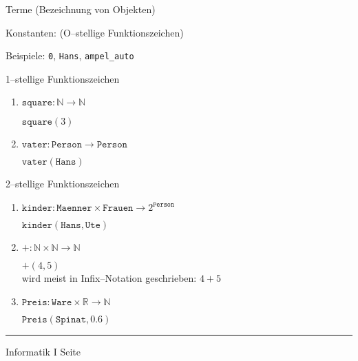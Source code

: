 
\begin{slide}{}
\normalsize
\begin{center}
Terme (Bezeichnung von Objekten)
\end{center}
\vspace{0.5cm}

\footnotesize
Konstanten: (O--stellige Funktionszeichen) 
\vspace{0.5cm}

Beispiele: {\tt 0}, \texttt{Hans}, \texttt{ampel\_auto}
\vspace{0.5cm}

1--stellige Funktionszeichen
\begin{enumerate}
\item $\mathtt{square}: \mathbb{N} \rightarrow \mathbb{N}$

      $\mathtt{square}(3)$
\item $\mathtt{vater}: \mathtt{Person} \rightarrow \mathtt{Person}$

      $\mathtt{vater}(\mathtt{Hans})$
\end{enumerate}

2--stellige Funktionszeichen
\begin{enumerate}
\item $\mathtt{kinder}: \mathtt{Maenner} \times \mathtt{Frauen} \rightarrow 2^\mathtt{Person}$

      $\mathtt{kinder}(\mathtt{Hans}, \mathtt{Ute})$
\item $+: \mathbb{N} \times \mathbb{N} \rightarrow \mathbb{N}$
      
      $+(4, 5)$ \\
         wird meist in Infix--Notation geschrieben: $4 + 5$
\item $\mathtt{Preis}: \mathtt{Ware} \times \mathbb{R} \rightarrow \mathbb{N}$
      
      $\mathtt{Preis}( \mathtt{Spinat}, 0.6 )$
\end{enumerate}

\vspace*{\fill}
\tiny \addtocounter{mypage}{1}
\rule{15cm}{1mm}
Informatik I  \hspace*{\fill} Seite 
\end{slide}


